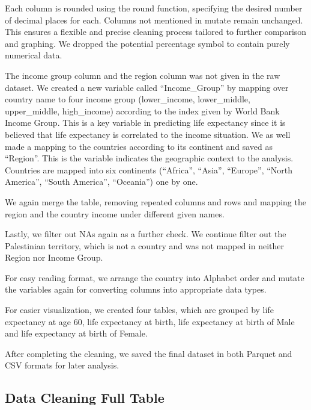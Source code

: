 \documentclass[
  letterpaper,
  DIV=11,
  numbers=noendperiod]{scrartcl}
\begin{document}
Each column is rounded using the round function, specifying the desired
number of decimal places for each. Columns not mentioned in mutate
remain unchanged. This ensures a flexible and precise cleaning process
tailored to further comparison and graphing. We dropped the potential
percentage symbol to contain purely numerical data.

The income group column and the region column was not given in the raw
dataset. We created a new variable called ``Income\_Group'' by mapping
over country name to four income group (lower\_income, lower\_middle,
upper\_middle, high\_income) according to the index given by World Bank
Income Group. This is a key variable in predicting life expectancy since
it is believed that life expectancy is correlated to the income
situation. We as well made a mapping to the countries according to its
continent and saved as ``Region''. This is the variable indicates the
geographic context to the analysis. Countries are mapped into six
continents (``Africa'', ``Asia'', ``Europe'', ``North America'', ``South
America'', ``Oceania'') one by one.

We again merge the table, removing repeated columns and rows and mapping
the region and the country income under different given names.

Lastly, we filter out NAs again as a further check. We continue filter
out the Palestinian territory, which is not a country and was not mapped
in neither Region nor Income Group.

For easy reading format, we arrange the country into Alphabet order and
mutate the variables again for converting columns into appropriate data
types.

For easier visualization, we created four tables, which are grouped by
life expectancy at age 60, life expectancy at birth, life expectancy at
birth of Male and life expectancy at birth of Female.

After completing the cleaning, we saved the final dataset in both
Parquet and CSV formats for later analysis.

\subsection{Data Cleaning Full Table}\label{data-cleaning-full-table}
\end{document}
